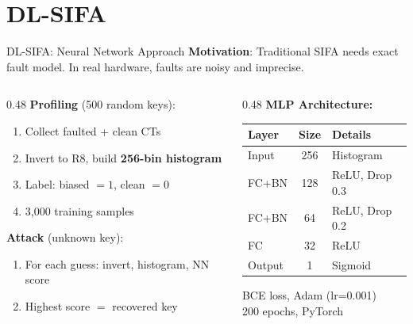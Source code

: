 \documentclass[aspectratio=169]{beamer}
\begin{document}
\section{DL-SIFA}
\begin{frame}{DL-SIFA: Neural Network Approach}
\textbf{Motivation}: Traditional SIFA needs exact fault model. In real hardware, faults are noisy and imprecise.

\vspace{0.2cm}
\begin{columns}[T]
\begin{column}{0.48\textwidth}
\textbf{Profiling} (500 random keys):
\begin{enumerate}
    \item Collect faulted + clean CTs
    \item Invert to R8, build \textbf{256-bin histogram}
    \item Label: biased $=1$, clean $=0$
    \item 3,000 training samples
\end{enumerate}

\vspace{0.2cm}
\textbf{Attack} (unknown key):
\begin{enumerate}
    \item For each guess: invert, histogram, NN score
    \item Highest score $=$ recovered key
\end{enumerate}
\end{column}
\begin{column}{0.48\textwidth}
\textbf{MLP Architecture:}
\vspace{0.1cm}

\begin{tabular}{lcl}
\toprule
\textbf{Layer} & \textbf{Size} & \textbf{Details} \\
\midrule
Input & 256 & Histogram \\
FC+BN & 128 & ReLU, Drop 0.3 \\
FC+BN & 64 & ReLU, Drop 0.2 \\
FC & 32 & ReLU \\
Output & 1 & Sigmoid \\
\bottomrule
\end{tabular}

\vspace{0.2cm}
\small BCE loss, Adam (lr=0.001) \\
200 epochs, PyTorch
\end{column}
\end{columns}
\end{frame}
\end{document}
